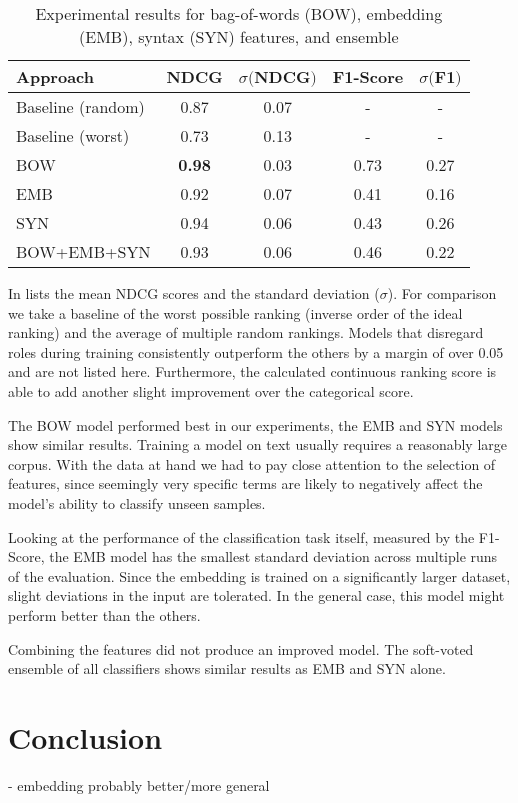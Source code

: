 \begin{table}
	\caption{Experimental results for bag-of-words (BOW), embedding (EMB), syntax (SYN) features, and ensemble}
	\label{tab:results}
	\begin{tabular}{lcccc}
		\toprule
		Approach & NDCG & $\sigma ($NDCG$)$ & F1-Score &  $\sigma ($F1$)$\\
		\midrule
		Baseline (random) & 0.87 & 0.07 & - & - \\
		Baseline (worst)  & 0.73 & 0.13 & - & - \\
		\midrule
		BOW & \textbf{0.98} & 0.03 & 0.73 & 0.27\\
		EMB & 0.92 & 0.07 & 0.41 & 0.16\\
		SYN & 0.94 & 0.06 & 0.43 & 0.26 \\
		BOW+EMB+SYN& 0.93 & 0.06 & 0.46 & 0.22\\
		\bottomrule
	\end{tabular}
\end{table}

In  lists the mean NDCG scores and the standard deviation ($\sigma$).
For comparison we take a baseline of the worst possible ranking (inverse order of the ideal ranking) and the average of multiple random rankings.
Models that disregard roles during training consistently outperform the others by a margin of over 0.05 and are not listed here.
Furthermore, the calculated continuous ranking score is able to add another slight improvement over the categorical score.

The BOW model performed best in our experiments, the EMB and SYN models show similar results. 
Training a model on text usually requires a reasonably large corpus.
With the data at hand we had to pay close attention to the selection of features, since seemingly very specific terms are likely to negatively affect the model's ability to classify unseen samples.

Looking at the performance of the classification task itself, measured by the F1-Score, the EMB model has the smallest standard deviation across multiple runs of the evaluation.
Since the embedding is trained on a significantly larger dataset, slight deviations in the input are tolerated.
In the general case, this model might perform better than the others.

Combining the features did not produce an improved model. The soft-voted ensemble of all classifiers shows similar results as EMB and SYN alone.


\section{Conclusion}
- embedding probably better/more general

